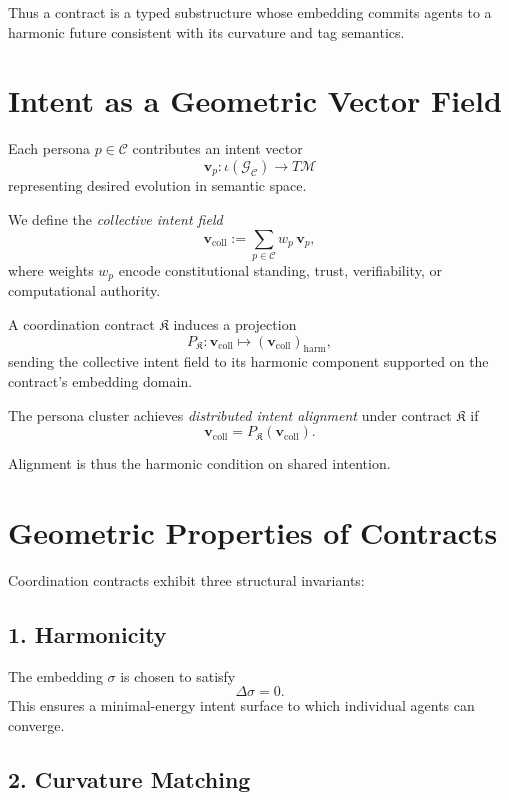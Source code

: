 Thus a contract is a typed substructure whose embedding commits agents to a
harmonic future consistent with its curvature and tag semantics.


\section{Intent as a Geometric Vector Field}

Each persona $p \in \mathcal{C}$ contributes an intent vector
\[
\mathbf{v}_p : \iota(\mathcal{G}_{\mathcal{C}}) \to T\mathcal{M}
\]
representing desired evolution in semantic space.

We define the \emph{collective intent field}
\[
\mathbf{v}_{\mathrm{coll}}
    := \sum_{p \in \mathcal{C}} w_p \,\mathbf{v}_p,
\]
where weights $w_p$ encode constitutional standing,
trust, verifiability, or computational authority.

A coordination contract $\mathfrak{K}$ induces a projection
\[
P_{\mathfrak{K}} : \mathbf{v}_{\mathrm{coll}} \mapsto
(\mathbf{v}_{\mathrm{coll}})_{\mathrm{harm}},
\]
sending the collective intent field to its harmonic component supported on
the contract's embedding domain.

\begin{definition}
The persona cluster achieves \emph{distributed intent alignment}
under contract $\mathfrak{K}$ if
\[
\mathbf{v}_{\mathrm{coll}}
  = P_{\mathfrak{K}}(\mathbf{v}_{\mathrm{coll}}).
\]
\end{definition}

Alignment is thus the harmonic condition on shared intention.


\section{Geometric Properties of Contracts}

Coordination contracts exhibit three structural invariants:


\subsection{1. Harmonicity}

The embedding $\sigma$ is chosen to satisfy
\[
\Delta \sigma = 0.
\]
This ensures a minimal-energy intent surface
to which individual agents can converge.


\subsection{2. Curvature Matching}

